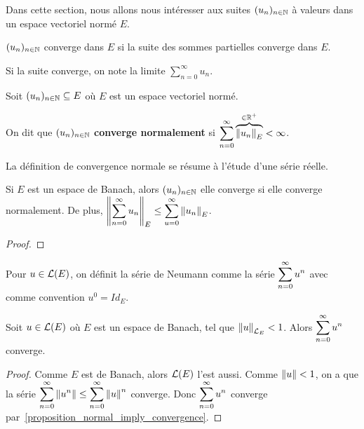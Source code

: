 Dans cette section, nous allons nous intéresser aux suites
$(u_{n})_{n \in \mathbb{N}}$ à valeurs dans un espace vectoriel normé $E$.

\begin{definition}
\label{definition_serie_convergence}
	$(u_{n})_{n \in \mathbb{N}}$ converge dans $E$ si
	la suite des sommes partielles converge dans $E$.

	Si la suite converge, on note la limite $\displaystyle \sum_{n = 0}^{\infty}
	u_{n}$.
\end{definition}

\begin{definition}
\label{definition_serie_normal_convergence}
	Soit $(u_{n})_{n \in \mathbb{N}} \subseteq E$ où $E$ est un espace
	vectoriel normé.

	On dit que $(u_{n})_{n \in \mathbb{N}}$ \textbf{converge normalement} si
	$\displaystyle \sum_{n = 0}^{\infty} \overbrace{\norm{u_{n}}_{E}}^{\in \mathbb{R}^{+}} < \infty$.
\end{definition}

La définition de convergence normale se résume à l'étude d'une série réelle.

\begin{proposition}
\label{proposition_normal_imply_convergence}
	Si $E$ est un espace de Banach, alors $(u_{n})_{n \in \mathbb{N}}$ elle
	converge si elle converge normalement. De plus,
	$\norm{\displaystyle \sum_{n = 0}^{\infty} u_{n}}_{E} \leq
	\displaystyle \sum_{u = 0}^{\infty} \norm{u_{n}}_{E}$.
\end{proposition}

\ifdefined\outputproof
\begin{proof}

\end{proof}
\fi

\begin{definition}
\label{definition_neumann_serie}
	Pour $u \in \mathcal{L}(E)$, on définit la série de Neumann comme la
	série $\displaystyle \sum_{n = 0}^{\infty} u^{n}$ avec comme convention $u^{0} = Id_{E}$.
\end{definition}

\begin{proposition}
	Soit $u \in \mathcal{L}(E)$ où $E$ est un espace de Banach, tel que
	$\norm{u}_{\mathcal{L}_{E}} < 1$. Alors
	$\displaystyle \sum_{n = 0}^{\infty} u^{n}$ converge.
\end{proposition}

\ifdefined\outputproof
\begin{proof}
	Comme $E$ est de Banach, alors $\mathcal{L}(E)$ l'est aussi. Comme $\norm{u}
	< 1$, on a que la série $\displaystyle \sum_{n = 0}^{\infty} \norm{u^{n}} \leq
	\displaystyle \sum_{n = 0}^{\infty} \norm{u}^{n}$ converge. Donc
	$\displaystyle \sum_{n = 0}^{\infty} u^{n}$ converge
	par~\ref{proposition_normal_imply_convergence}.
\end{proof}
\fi

